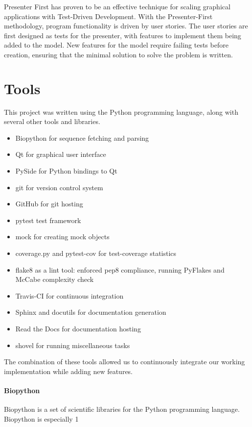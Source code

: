 \documentclass{bioinfo}
\begin{document}
    Presenter First has proven to be an effective technique for scaling graphical applications with Test-Driven Development. With the Presenter-First methodology, program functionality is driven by user stories. The user stories are first designed as tests for the presenter, with features to implement them being added to the model. New features for the model require failing tests before creation, ensuring that the minimal solution to solve the problem is written.
    

\section{Tools}

This project was written using the Python programming language, along with several other tools and libraries.

\begin{itemize}
\item Biopython for sequence fetching and parsing
\item Qt for graphical user interface
\item PySide for Python bindings to Qt
\item git for version control system
\item GitHub for git hosting
\item pytest test framework
\item mock for creating mock objects
\item coverage.py and pytest-cov for test-coverage statistics
\item flake8 as a lint tool: enforced pep8 compliance, running PyFlakes and McCabe complexity check
\item Travis-CI for continuous integration
\item Sphinx and docutils for documentation generation
\item Read the Docs for documentation hosting
\item shovel for running miscellaneous tasks
\end{itemize}
    
    The combination of these tools allowed us to continuously integrate our working implementation while adding new features.

\paragraph{Biopython\textcolon}
Biopython is a set of scientific libraries for the Python programming language. Biopython is especially 1
\end{document}
